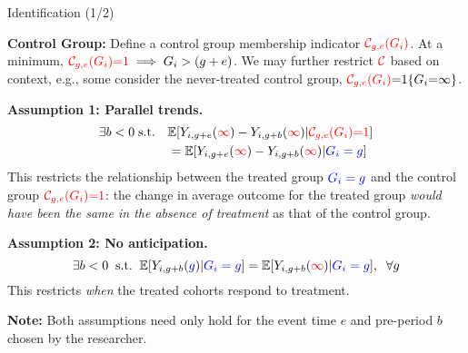 \documentclass[usenames,dvipsnames]{beamer}
\begin{document}
\begin{frame}{Identification (1/2)}

\textbf{Control Group:} Define a control group membership indicator ${\color{red} \mathcal{C}_{g,e}(G_i)}$. At a minimum,   $ {\color{red} \mathcal{C}_{g,e}(G_i)  {=} 1} \implies G_i > (g+e)$. We may further restrict ${\color{red} \mathcal{C}}$ based on context, e.g., some  consider the never-treated control group, ${\color{red} \mathcal{C}_{g,e}(G_i)}  {=}  1\{G_i  {=}  \infty\}$.

\textbf{Assumption 1: Parallel trends.}
\begin{equation} \notag
\begin{aligned}
 \exists b<0 \; \text{s.t.} &\quad \mathbb{E}[Y_{i,g+e}({\color{red} \infty}) - Y_{i,g+b}({\color{red} \infty}) | {\color{red} \mathcal{C}_{g,e}(G_i)  {=} 1}] 
\\ &\quad = \mathbb{E}[Y_{i,g+e}({\color{red} \infty}) - Y_{i,g+b}({\color{red} \infty}) | {\color{blue}G_i = g}] 
\end{aligned}
\end{equation}
This restricts the relationship between the treated group ${\color{blue}G_i = g}$ and the control group ${\color{red} \mathcal{C}_{g,e}(G_i) {=} 1}$: the change in average outcome for the treated group \textit{would have been the same in the absence of treatment} as that of the control group.

\textbf{Assumption 2: No anticipation.} 
\begin{equation} \notag
\exists b<0 \;\; \text{s.t.} \;\; \mathbb{E}[Y_{i,g+b}({\color{blue} g}) | {\color{blue} G_i = g }] = \mathbb{E}[Y_{i,g+b}({\color{red} \infty}) | {\color{blue} G_i = g }] , \;\; \forall g
\end{equation}
This restricts \textit{when} the treated cohorts respond to treatment. 

\textbf{Note:} Both assumptions need only hold for the event time $e$ and pre-period $b$ chosen by the researcher.
 
\end{frame}
\end{document}
